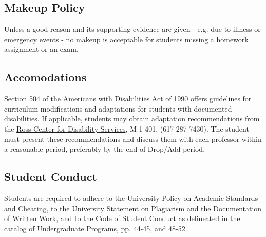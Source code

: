 \documentclass[12pt,letterpaper,twoside]{article}
\begin{document}
\subsection*{Makeup Policy}
Unless a good reason and its supporting evidence are given - e.g. due to illness or emergency events - no makeup is acceptable for students missing a homework assignment or an exam.

\subsection*{Accomodations}
Section 504 of the Americans with Disabilities Act of 1990 offers guidelines for curriculum modifications and adaptations for students with documented disabilities. If applicable, students may obtain adaptation recommendations from the \href{http://www.umb.edu/academics/vpass/disability}{Ross Center for Disability Services}, M-1-401, (617-287-7430). The student must present these recommendations and discuss them with each professor within a reasonable period, preferably by the end of Drop/Add period.

\subsection*{Student Conduct}
Students are required to adhere to the University Policy on Academic Standards and Cheating, to the University Statement on Plagiarism and the Documentation of Written Work, and to the \href{http://www.umb.edu/life_on_campus/policies/community/code}{Code of Student Conduct} as delineated in the catalog of Undergraduate Programs, pp. 44-45, and 48-52.
\end{document}
